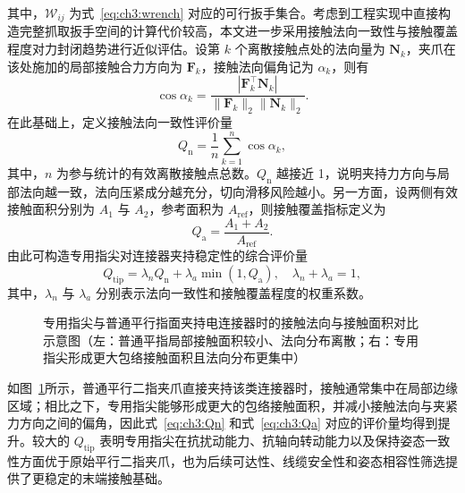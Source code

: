其中，$\mathcal{W}_{ij}$ 为式~\eqref{eq:ch3:wrench} 对应的可行扳手集合。考虑到工程实现中直接构造完整抓取扳手空间的计算代价较高，本文进一步采用接触法向一致性与接触覆盖程度对力封闭趋势进行近似评估。设第 $k$ 个离散接触点处的法向量为 $\mathbf{N}_k$，夹爪在该处施加的局部接触合力方向为 $\mathbf{F}_k$，接触法向偏角记为 $\alpha_k$，则有
\begin{equation}
  \cos\alpha_k=
  \frac{\left|\mathbf{F}_k^{\top}\mathbf{N}_k\right|}
  {\|\mathbf{F}_k\|_2\|\mathbf{N}_k\|_2}.
  \label{eq:ch3:alpha}
\end{equation}
在此基础上，定义接触法向一致性评价量
\begin{equation}
  Q_{\mathrm{n}}=
  \frac{1}{n}\sum_{k=1}^{n}\cos\alpha_k,
  \label{eq:ch3:Qn}
\end{equation}
其中，$n$ 为参与统计的有效离散接触点总数。$Q_{\mathrm{n}}$ 越接近 1，说明夹持力方向与局部法向越一致，法向压紧成分越充分，切向滑移风险越小。另一方面，设两侧有效接触面积分别为 $A_1$ 与 $A_2$，参考面积为 $A_{\mathrm{ref}}$，则接触覆盖指标定义为
\begin{equation}
  Q_{\mathrm{a}}=\frac{A_1+A_2}{A_{\mathrm{ref}}}.
  \label{eq:ch3:Qa}
\end{equation}
由此可构造专用指尖对连接器夹持稳定性的综合评价量
\begin{equation}
  Q_{\mathrm{tip}}=\lambda_{n}Q_{\mathrm{n}}+\lambda_{a}\min(1,Q_{\mathrm{a}}),
  \quad \lambda_{n}+\lambda_{a}=1,
  \label{eq:ch3:Qtip}
\end{equation}
其中，$\lambda_n$ 与 $\lambda_a$ 分别表示法向一致性和接触覆盖程度的权重系数。

\begin{figure}[htbp]
  \centering
  \caption{专用指尖与普通平行指面夹持电连接器时的接触法向与接触面积对比示意图（左：普通平指局部接触面积较小、法向分布离散；右：专用指尖形成更大包络接触面积且法向分布更集中）}
  \label{fig:ch3:force-closure-vis}
\end{figure}

如图~\ref{fig:ch3:force-closure-vis}所示，普通平行二指夹爪直接夹持该类连接器时，接触通常集中在局部边缘区域；相比之下，专用指尖能够形成更大的包络接触面积，并减小接触法向与夹紧力方向之间的偏角，因此式~\eqref{eq:ch3:Qn} 和式~\eqref{eq:ch3:Qa} 对应的评价量均得到提升。较大的 $Q_{\mathrm{tip}}$ 表明专用指尖在抗扰动能力、抗轴向转动能力以及保持姿态一致性方面优于原始平行二指夹爪，也为后续可达性、线缆安全性和姿态相容性筛选提供了更稳定的末端接触基础。

